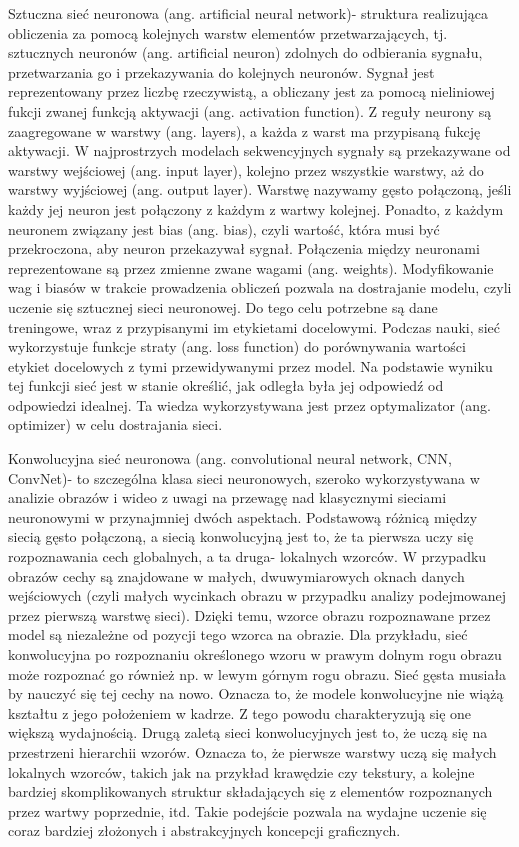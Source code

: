 Sztuczna sieć neuronowa (ang. artificial neural network)- struktura realizująca obliczenia za pomocą kolejnych warstw elementów przetwarzających, tj. sztucznych neuronów (ang. artificial neuron) zdolnych do odbierania sygnału, przetwarzania go i przekazywania do kolejnych neuronów. Sygnał jest reprezentowany przez liczbę rzeczywistą, a obliczany jest za pomocą nieliniowej fukcji zwanej funkcją aktywacji (ang. activation function). Z reguły neurony są zaagregowane w warstwy (ang. layers), a każda z warst ma przypisaną fukcję aktywacji. W najprostrzych modelach sekwencyjnych sygnały są przekazywane od warstwy wejściowej (ang. input layer), kolejno przez wszystkie warstwy, aż do warstwy wyjściowej (ang. output layer). Warstwę nazywamy gęsto połączoną, jeśli każdy jej neuron jest połączony z każdym z wartwy kolejnej. Ponadto, z każdym neuronem związany jest bias (ang. bias), czyli wartość, która musi być przekroczona, aby neuron przekazywał sygnał. Połączenia między neuronami reprezentowane są przez zmienne zwane wagami (ang. weights). Modyfikowanie wag i biasów w trakcie prowadzenia obliczeń pozwala na dostrajanie modelu, czyli uczenie się sztucznej sieci neuronowej. Do tego celu potrzebne są dane treningowe, wraz z przypisanymi im etykietami docelowymi. Podczas nauki, sieć wykorzystuje funkcje straty (ang. loss function) do porównywania wartości etykiet docelowych z tymi przewidywanymi przez model. Na podstawie wyniku tej funkcji sieć jest w stanie określić, jak odległa była jej odpowiedź od odpowiedzi idealnej. Ta wiedza wykorzystywana jest przez optymalizator (ang. optimizer) w celu dostrajania sieci.

Konwolucyjna sieć neuronowa (ang. convolutional neural network, CNN, ConvNet)- to szczególna klasa sieci neuronowych, szeroko wykorzystywana w analizie obrazów i wideo z uwagi na przewagę nad klasycznymi sieciami neuronowymi w przynajmniej dwóch aspektach. Podstawową różnicą między siecią gęsto połączoną, a siecią konwolucyjną jest to, że ta pierwsza uczy się rozpoznawania cech globalnych, a ta druga- lokalnych wzorców. W przypadku obrazów cechy są znajdowane w małych, dwuwymiarowych oknach danych wejściowych (czyli małych wycinkach obrazu w przypadku analizy podejmowanej przez pierwszą warstwę sieci). Dzięki temu, wzorce obrazu rozpoznawane przez model są niezależne od pozycji tego wzorca na obrazie. Dla przykładu, sieć konwolucyjna po rozpoznaniu określonego wzoru w prawym dolnym rogu obrazu może rozpoznać go również np. w lewym górnym rogu obrazu. Sieć gęsta musiała by nauczyć się tej cechy na nowo. Oznacza to, że modele konwolucyjne nie wiążą kształtu z jego położeniem w kadrze. Z tego powodu charakteryzują się one większą wydajnością. Drugą zaletą sieci konwolucyjnych jest to, że uczą się na przestrzeni hierarchii wzorów. Oznacza to, że pierwsze warstwy uczą się małych lokalnych wzorców, takich jak na przykład krawędzie czy tekstury, a kolejne bardziej skomplikowanych struktur składających się z elementów rozpoznanych przez wartwy poprzednie, itd. Takie podejście pozwala na wydajne uczenie się coraz bardziej złożonych i abstrakcyjnych koncepcji graficznych.


